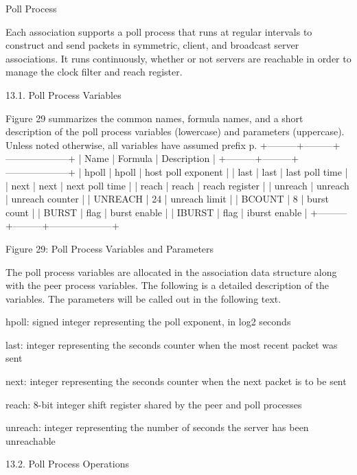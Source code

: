  Poll Process

   Each association supports a poll process that runs at regular
   intervals to construct and send packets in symmetric, client, and
   broadcast server associations.  It runs continuously, whether or not
   servers are reachable in order to manage the clock filter and reach
   register.

13.1.  Poll Process Variables

   Figure 29 summarizes the common names, formula names, and a short
   description of the poll process variables (lowercase) and parameters
   (uppercase).  Unless noted otherwise, all variables have assumed
   prefix p.
                    +---------+---------+--------------------+
                   | Name    | Formula | Description        |
                   +---------+---------+--------------------+
                   | hpoll   | hpoll   | host poll exponent |
                   | last    | last    | last poll time     |
                   | next    | next    | next poll time     |
                   | reach   | reach   | reach register     |
                   | unreach | unreach | unreach counter    |
                   | UNREACH | 24      | unreach limit      |
                   | BCOUNT  | 8       | burst count        |
                   | BURST   | flag    | burst enable       |
                   | IBURST  | flag    | iburst enable      |
                   +---------+---------+--------------------+

             Figure 29: Poll Process Variables and Parameters

   The poll process variables are allocated in the association data
   structure along with the peer process variables.  The following is a
   detailed description of the variables.  The parameters will be called
   out in the following text.

   hpoll: signed integer representing the poll exponent, in log2 seconds

   last: integer representing the seconds counter when the most recent
   packet was sent

   next: integer representing the seconds counter when the next packet
   is to be sent

   reach: 8-bit integer shift register shared by the peer and poll
   processes

   unreach: integer representing the number of seconds the server has
   been unreachable

13.2.  Poll Process Operations

